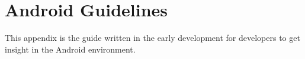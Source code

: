 \chapter{Android Guidelines}
\label{app:android_guidelines}

This appendix is the guide written in the early development for developers to get insight in the Android environment.

